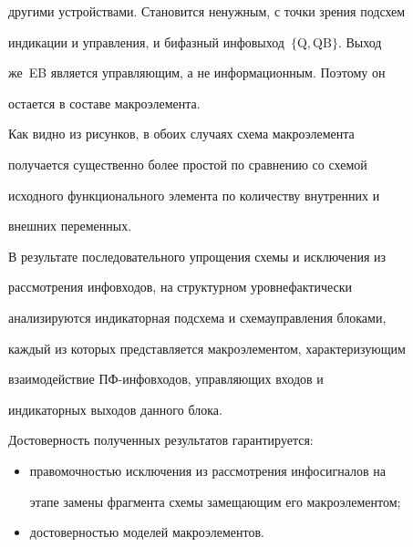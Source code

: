 другими устройствами. Становится ненужным, с точки зрения подсхем


индикации и управления, и бифазный инфовыход~$\{\mathrm{Q}, \mathrm{QB}\}$. Выход


же~EB является управляющим, а не информационным. Поэтому он


остается в составе макроэлемента.





   Как видно из рисунков, в обоих случаях схема макроэлемента


получается существенно более простой по сравнению со схемой


исходного функционального элемента по количеству внутренних и


внешних переменных.





   В результате последовательного упрощения схемы и ис\-клю\-че\-ния из


рассмотрения инфовходов, на структурном уровне\linebreak фактически


анализируются индикаторная подсхема и схема\linebreak управ\-ле\-ния блоками,


каждый из которых представляется макроэлементом, характеризующим


взаимодействие ПФ-ин\-фо\-вхо\-дов,  управ\-ля\-ющих входов и


индикаторных выходов данного блока.





   Достоверность полученных результатов гарантируется:\\[-9pt]


   \begin{itemize}


   \item правомочностью исключения из рассмотрения инфосигналов на


этапе замены фрагмента схемы замещающим его макроэлементом;\\[-11pt]


   \item достоверностью моделей макроэлементов.\\[-9pt]


   \end{itemize}





